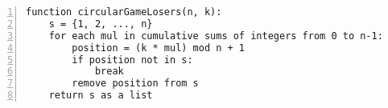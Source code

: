 \begin{figure*}
\centering
\begin{lstlisting}[breaklines=true, frame=shadowbox, numbers=left,]
function circularGameLosers(n, k):
    s = {1, 2, ..., n}
    for each mul in cumulative sums of integers from 0 to n-1:
        position = (k * mul) mod n + 1
        if position not in s:
            break
        remove position from s
    return s as a list
\end{lstlisting}
\label{lst:pseudo-python-acc}
\end{figure*}



